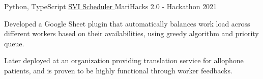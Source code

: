 \begin{cventries}
  \cventry
    {Python, TypeScript} %
    {\href{https://devpost.com/software/svi-scheduler}{SVI Scheduler {\faLink}}} %
    {MariHacks 2.0 - Hackathon} %
    {2021} %
    {
      \begin{cvitems} %
        \item {Developed a Google Sheet plugin that automatically balances work load across different workers based on their availabilities, using greedy algorithm and priority queue.}
        \item {Later deployed at an organization providing translation service for allophone patients, and is proven to be highly functional through worker feedbacks.}
      \end{cvitems}
    }

\end{cventries}

